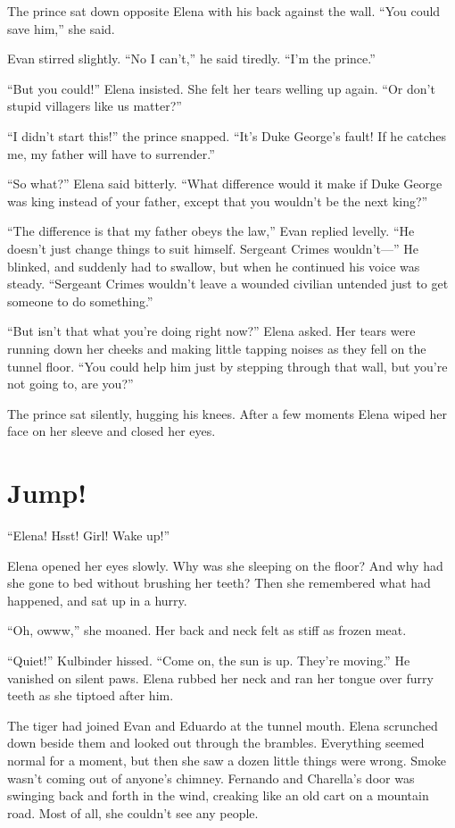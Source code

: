 \documentclass[10pt]{book}
\begin{document}
The prince sat down opposite Elena with his back against the wall.  ``You could save him,'' she said.

Evan stirred slightly. ``No I can't,'' he said tiredly. ``I'm the prince.''

``But you could!'' Elena insisted. She felt her tears welling up again. ``Or don't stupid villagers like us matter?''

``I didn't start this!'' the prince snapped. ``It's Duke George's fault! If he catches me, my father will have to surrender.''

``So what?'' Elena said bitterly. ``What difference would it make if Duke George was king instead of your father, except that you wouldn't be the next king?''

``The difference is that my father obeys the law,'' Evan replied levelly. ``He doesn't just change things to suit himself. Sergeant Crimes wouldn't---'' He blinked, and suddenly had to swallow, but when he continued his voice was steady. ``Sergeant Crimes wouldn't leave a wounded civilian untended just to get someone to do something.''

``But isn't that what you're doing right now?'' Elena asked. Her tears were running down her cheeks and making little tapping noises as they fell on the tunnel floor. ``You could help him just by stepping through that wall, but you're not going to, are you?''

The prince sat silently, hugging his knees. After a few moments Elena wiped her face on her sleeve and closed her eyes.

\chapter{Jump!}

``Elena! Hsst! Girl! Wake up!''

Elena opened her eyes slowly. Why was she sleeping on the floor? And why had she gone to bed without brushing her teeth? Then she remembered what had happened, and sat up in a hurry.

``Oh, owww,'' she moaned. Her back and neck felt as stiff as frozen meat.

``Quiet!'' Kulbinder hissed. ``Come on, the sun is up. They're moving.'' He vanished on silent paws. Elena rubbed her neck and ran her tongue over furry teeth as she tiptoed after him.

The tiger had joined Evan and Eduardo at the tunnel mouth. Elena scrunched down beside them and looked out through the brambles. Everything seemed normal for a moment, but then she saw a dozen little things were wrong. Smoke wasn't coming out of anyone's chimney. Fernando and Charella's door was swinging back and forth in the wind, creaking like an old cart on a mountain road. Most of all, she couldn't see any people.
\end{document}
